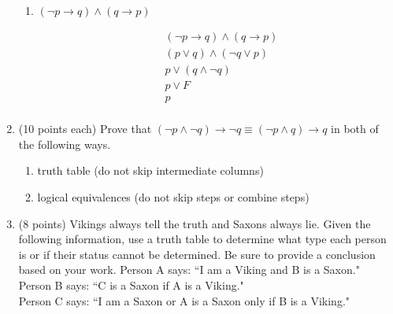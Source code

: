 \documentclass[11pt]{article}
\newcommand{\pt}[1]{\textcolor{maincolor}{(#1 points)}}
\newcommand{\pte}[1]{\textcolor{maincolor}{(#1 points each)}}
\begin{document}
\begin{justify}
\begin{enumerate}
\begin{enumerate}
\item $(\lnot p \rightarrow q) \wedge (q \rightarrow p)$
\begin{mdframed}
    \begin{align*}
        &(\lnot p \rightarrow q) \wedge (q \rightarrow p) \tag{given} \\
        &(p \lor q) \land (\lnot q \lor p) \tag{conditional disjunction law} \\
        &p \lor (q \land \lnot q) \tag{some law idk} \\
        &p \lor F \\
        &p \\
    \end{align*}
\end{mdframed}
\end{enumerate}
\item \pte{10} Prove that $(\lnot p\wedge \lnot q) \rightarrow \lnot q \equiv
(\lnot p\wedge q) \rightarrow q$ in both of the following ways.
\begin{enumerate}
\item truth table (do not skip intermediate columns)
\item logical equivalences (do not skip steps or combine steps)
\end{enumerate}
\item \pt{8} Vikings always tell the truth and Saxons always lie. Given the
following information, use a truth table to determine what type each person is or
if their status cannot be determined. Be sure to provide a conclusion based on
your work.
Person A says: ``I am a Viking and B is a Saxon."\\
Person B says: ``C is a Saxon if A is a Viking."\\
Person C says: ``I am a Saxon or A is a Saxon only if B is a Viking."
\end{enumerate}
\end{justify}
\end{document}
